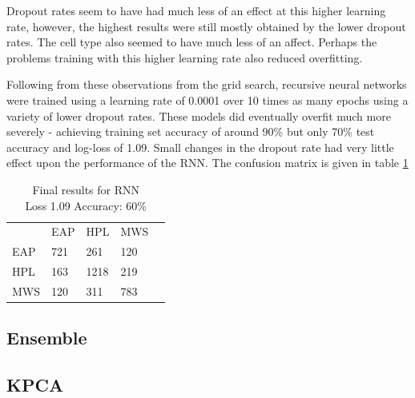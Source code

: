     Dropout rates seem to have had much less of an effect at this higher
    learning rate, however, the highest results were still mostly obtained by
    the lower dropout rates. The cell type also seemed to have much less of an
    affect. Perhaps the problems training with this higher learning rate also
    reduced overfitting.

    Following from these observations from the grid search, recursive neural
    networks were trained using a learning rate of 0.0001 over 10 times as many
    epochs using a variety of lower dropout rates. These models did eventually
    overfit much more severely - achieving training set accuracy of around 90\%
    but only 70\% test accuracy and log-loss of 1.09. Small changes in the
    dropout rate had very little effect upon the performance of the RNN. The
    confusion matrix is given in table \ref{tab:rnn_res}

\begin{table}[h]
\centering
\begin{tabular}{m{1cm}|m{1cm}|m{1cm}|m{1cm}|m{0cm}}
\multicolumn{1}{m{1cm}}{} & \multicolumn{1}{m{1cm}}{EAP} & \multicolumn{1}{m{1cm}}{HPL} & \multicolumn{1}{m{1cm}}{MWS} &\\[5pt]
\cline{2-4}
EAP & 721 & 261 & 120 & \\[5pt]
\cline{2-4}
HPL & 163 & 1218 & 219 & \\[5pt]
\cline{2-4}
MWS & 120 & 311 & 783 & \\[5pt]
\cline{2-4}
\end{tabular}
\caption{Final results for RNN\\Loss 1.09 Accuracy: 60\% }
\label{tab:rnn_res}
\end{table}


    \subsection{Ensemble}
    \label{sec:ensemble}

\subsection{KPCA}
\label{sec:kpca}
  

